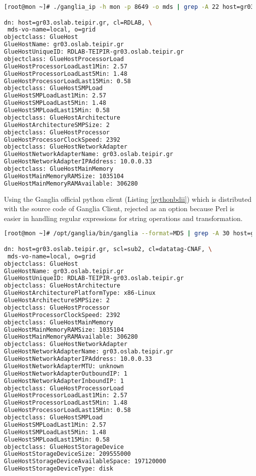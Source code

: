 \begin{lstlisting}[language=bash,caption=Perl Ganglia Information Provider for MDS,label=perlbdii]
[root@mon ~]# ./ganglia_ip -h mon -p 8649 -o mds | grep -A 22 host=gr03

dn: host=gr03.oslab.teipir.gr, cl=RDLAB, \
 mds-vo-name=local, o=grid
objectclass: GlueHost
GlueHostName: gr03.oslab.teipir.gr
GlueHostUniqueID: RDLAB-TEIPIR-gr03.oslab.teipir.gr
objectclass: GlueHostProcessorLoad
GlueHostProcessorLoadLast1Min: 2.57
GlueHostProcessorLoadLast5Min: 1.48
GlueHostProcessorLoadLast15Min: 0.58
objectclass: GlueHostSMPLoad
GlueHostSMPLoadLast1Min: 2.57
GlueHostSMPLoadLast5Min: 1.48
GlueHostSMPLoadLast15Min: 0.58
objectclass: GlueHostArchitecture
GlueHostArchitectureSMPSize: 2
objectclass: GlueHostProcessor
GlueHostProcessorClockSpeed: 2392
objectclass: GlueHostNetworkAdapter
GlueHostNetworkAdapterName: gr03.oslab.teipir.gr
GlueHostNetworkAdapterIPAddress: 10.0.0.33
objectclass: GlueHostMainMemory
GlueHostMainMemoryRAMSize: 1035104
GlueHostMainMemoryRAMAvailable: 306280
\end{lstlisting}

Using the Ganglia official python client (Listing \ref{pythonbdii}) which is distributed with the source code of Ganglia Client, rejected as an option because Perl is easier in handling regular expressions for string operations and transformation.

\begin{lstlisting}[language=bash,caption=Python Ganglia client MDS export,label=pythonbdii]
[root@mon ~]# /opt/ganglia/bin/ganglia --format=MDS | grep -A 30 host=gr03

dn: host=gr03.oslab.teipir.gr, scl=sub2, cl=datatag-CNAF, \
 mds-vo-name=local, o=grid
objectclass: GlueHost
GlueHostName: gr03.oslab.teipir.gr
GlueHostUniqueID: RDLAB-TEIPIR-gr03.oslab.teipir.gr
objectclass: GlueHostArchitecture
GlueHostArchitecturePlatformType: x86-Linux
GlueHostArchitectureSMPSize: 2
objectclass: GlueHostProcessor
GlueHostProcessorClockSpeed: 2392
objectclass: GlueHostMainMemory
GlueHostMainMemoryRAMSize: 1035104
GlueHostMainMemoryRAMAvailable: 306280
objectclass: GlueHostNetworkAdapter
GlueHostNetworkAdapterName: gr03.oslab.teipir.gr
GlueHostNetworkAdapterIPAddress: 10.0.0.33
GlueHostNetworkAdapterMTU: unknown
GlueHostNetworkAdapterOutboundIP: 1
GlueHostNetworkAdapterInboundIP: 1
objectclass: GlueHostProcessorLoad
GlueHostProcessorLoadLast1Min: 2.57
GlueHostProcessorLoadLast5Min: 1.48
GlueHostProcessorLoadLast15Min: 0.58
objectclass: GlueHostSMPLoad
GlueHostSMPLoadLast1Min: 2.57
GlueHostSMPLoadLast5Min: 1.48
GlueHostSMPLoadLast15Min: 0.58
objectclass: GlueHostStorageDevice
GlueHostStorageDeviceSize: 209555000
GlueHostStorageDeviceAvailableSpace: 197120000
GlueHostStorageDeviceType: disk
\end{lstlisting}

